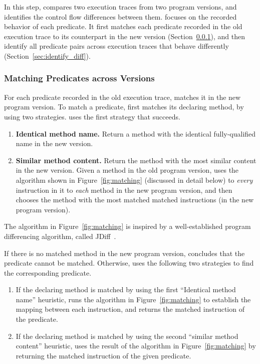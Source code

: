 

In this step, \ourtool compares two execution traces
from two program versions, and identifies the
control flow differences between them. \ourtool focuses on the
recorded behavior of each predicate. It first 
matches each predicate recorded in the old
execution trace to its counterpart in the new version
(Section~\ref{sec:match_predicate}),
and then identify all predicate pairs across execution traces that
behave differently (Section~\ref{sec:identify_diff}).


\subsubsection{Matching Predicates across Versions}
\label{sec:match_predicate}

For each predicate recorded in the old execution trace,
\ourtool matches it in the new program version.
To match a predicate, \ourtool first matches its declaring method,
by using two strategies. \ourtool uses
the first strategy that succeeds.



\begin{enumerate}
\item \textbf{Identical method name.} Return a method with the identical
fully-qualified name in the new version.
\item \textbf{Similar method content.} Return the method with
the most similar content in the new version. Given
a method in the old program version, \ourtool
uses the algorithm shown in Figure~\ref{fig:matching} (discussed
in detail below) to \textit{every} instruction in it to
\textit{each} method in the new program version, and then
chooses the method with the most matched matched instructions
(in the new program version).
\end{enumerate}

The algorithm in Figure~\ref{fig:matching} is inspired by
a well-established program differencing algorithm, called
JDiff~\cite{}. 

If there is no matched method in the new program
version, \ourtool concludes that the predicate cannot be
matched. Otherwise, \ourtool uses the following two strategies
to find the corresponding predicate.

\begin{enumerate}
\item If the declaring method is matched by using the first
``Identical method name'' heuristic, \ourtool runs the algorithm
in Figure~\ref{fig:matching} to establish the mapping between
each instruction, and returns the matched instruction of the
predicate.
\item If the declaring method is matched by using the second
``similar method content'' heuristic,  \ourtool
uses the result of the algorithm in Figure~\ref{fig:matching}
by returning the matched instruction of the given predicate.
\end{enumerate}

